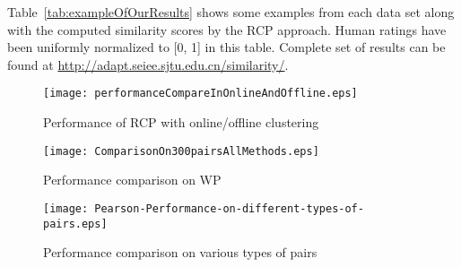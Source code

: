 Table~\ref{tab:exampleOfOurResults} shows some examples from each data set along with the computed similarity scores by the RCP approach. Human
ratings have been uniformly normalized to [0, 1] in this table. Complete set of results can be found at
\url{http://adapt.seiee.sjtu.edu.cn/similarity/}.


\begin{figure}[!t]
 \centerline{
 \texttt{[image: performanceCompareInOnlineAndOffline.eps]}}
 \caption{Performance of RCP with online/offline clustering}
 \label{fig:online-offiline}
\end{figure}

\begin{figure}[!t]
 \centerline{
  \texttt{[image: ComparisonOn300pairsAllMethods.eps]}}
 \caption{Performance comparison on WP}
 \label{fig:ComparisonOn300pairsAllMethods}
\end{figure}

\begin{figure}[!t]
 \centerline{
  \texttt{[image: Pearson-Performance-on-different-types-of-pairs.eps]}}
 \caption{Performance comparison on various types of pairs}
 \label{fig:Pearson-Performance-on-different-types-of-pairs}
\end{figure}

